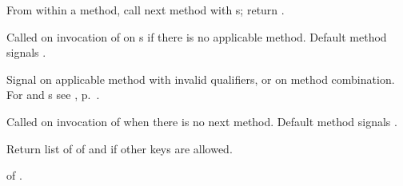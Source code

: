 \begin{LIST}{1cm}
  {
  From within a method, call next method with s; return
  .
  }

  {
  Called on invocation of  on s if
  there is no applicable method. Default method signals .
  }

  {
  Signal  on applicable method with invalid qualifiers, or
  on method combination. For  and s see
  , p.\ \pageref{section:Format}.
  }

  {
  Called on invocation of  when there is no next
  method. Default method signals .
  }

  {
  Return list of  of  and
  \retvalii{\T} if other keys are allowed.
  }

  {
   of .
  }


\end{LIST}

